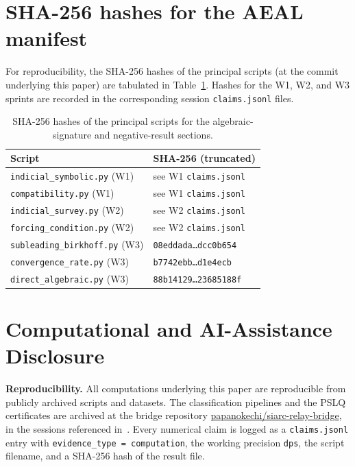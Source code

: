 \documentclass[11pt]{amsart}
\theoremstyle{definition}
\theoremstyle{remark}
\begin{document}
\section{SHA-256 hashes for the AEAL manifest}\label{app:hashes}

For reproducibility, the SHA-256 hashes of the principal scripts
(at the commit underlying this paper) are tabulated in
Table~\ref{tab:hashes}.  Hashes for the W1, W2, and W3 sprints are
recorded in the corresponding session \texttt{claims.jsonl} files.

\begin{table}[t]
\centering
\caption{SHA-256 hashes of the principal scripts for the
algebraic-signature and negative-result sections.}
\label{tab:hashes}
\begin{tabular}{ll}
\toprule
Script & SHA-256 (truncated) \\
\midrule
\texttt{indicial\_symbolic.py} (W1) & see W1 \texttt{claims.jsonl} \\
\texttt{compatibility.py} (W1) & see W1 \texttt{claims.jsonl} \\
\texttt{indicial\_survey.py} (W2) & see W2 \texttt{claims.jsonl} \\
\texttt{forcing\_condition.py} (W2) & see W2 \texttt{claims.jsonl} \\
\texttt{subleading\_birkhoff.py} (W3) & \texttt{08eddada\dots dcc0b654} \\
\texttt{convergence\_rate.py} (W3) & \texttt{b7742ebb\dots d1e4ecb} \\
\texttt{direct\_algebraic.py} (W3) & \texttt{88b14129\dots 23685188f} \\
\bottomrule
\end{tabular}
\end{table}

\section*{Computational and AI-Assistance Disclosure}

\textbf{Reproducibility.}  All computations underlying this paper
are reproducible from publicly archived scripts and datasets.  The
classification pipelines and the PSLQ certificates are archived at
the bridge repository
\href{https://github.com/papanokechi/siarc-relay-bridge}%
{papanokechi/siarc-relay-bridge}, in the sessions referenced
in~\cite{TRINote, SprintW1Report, SprintW2Report, SprintW3Report}.
Every numerical claim is logged as a \texttt{claims.jsonl} entry
with \texttt{evidence\_type = computation}, the working precision
\texttt{dps}, the script filename, and a SHA-256 hash of the result
file.
\end{document}
